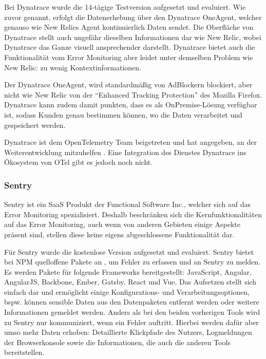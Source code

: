 Bei Dynatrace wurde die 14-tägige Testversion aufgesetzt und evaluiert. Wie zuvor genannt, erfolgt die Datenerhebung über den Dynatrace OneAgent, welcher genauso wie New Relics Agent kontinuierlich Daten sendet. Die Oberfläche von Dynatrace stellt auch ungefähr dieselben Informationen dar wie New Relic, wobei Dynatrace das Ganze visuell ansprechender darstellt. Dynatrace bietet auch die Funktionalität vom Error Monitoring aber leidet unter demselben Problem wie New Relic: zu wenig Kontextinformationen.

Der Dynatrace OneAgent, wird standardmäßig von AdBlockern blockiert, aber nicht wie New Relic von der \enquote{Enhanced Tracking Protection} des Mozilla Firefox. Dynatrace kann zudem damit punkten, dass es als OnPremise-Lösung verfügbar ist, sodass Kunden genau bestimmen können, wo die Daten verarbeitet und gespeichert werden.

Dynatrace ist dem OpenTelemetry Team beigetreten und hat angegeben, an der Weiterentwicklung mitzuhelfen \cite{DynatraceJoinOTelProject}. Eine Integration des Dienstes Dynatrace ins Ökosystem von OTel gibt es jedoch noch nicht.

\subsubsection{Sentry}

Sentry \cite{Sentry} ist ein SaaS Produkt der Functional Software Inc., welcher sich auf das Error Monitoring spezialisiert. Deshalb beschränken sich die Kernfunktionalitäten auf das Error Monitoring, auch wenn von anderen Gebieten einige Aspekte präsent sind, stellen diese keine eigens abgeschlossene Funktionalität dar.

Für Sentry wurde die kostenlose Version aufgesetzt und evaluiert. Sentry bietet bei NPM quelloffene Pakete an \cite{SentryJSGithub}, um Fehler zu erfassen und an Sentry zu melden. Es werden Pakete für folgende Frameworks bereitgestellt: JavaScript, Angular, AngularJS, Backbone, Ember, Gatsby, React und Vue. Das Aufsetzen stellt sich einfach dar und ermöglicht einige Konfigurations- und Verarbeitungsoptionen, bspw. können sensible Daten aus den Datenpaketen entfernt werden oder weitere Informationen gemeldet werden. Anders als bei den beiden vorherigen Tools wird zu Sentry nur kommuniziert, wenn ein Fehler auftritt. Hierbei werden dafür aber umso mehr Daten erhoben: Detaillierte Klickpfade des Nutzers, Logmeldungen der Browserkonsole sowie die Informationen, die auch die anderen Tools bereitstellen.

